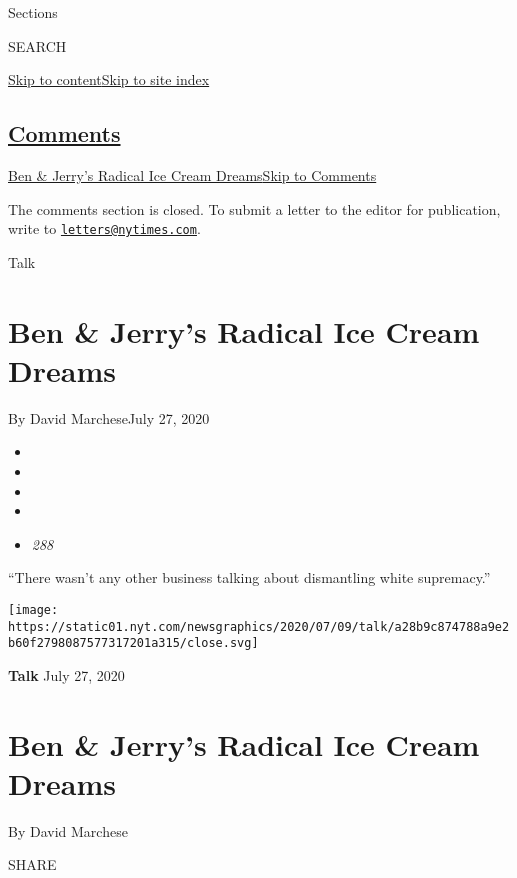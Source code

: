 Sections

SEARCH

\protect\hyperlink{site-content}{Skip to
content}\protect\hyperlink{site-index}{Skip to site index}

\hypertarget{comments}{%
\subsection{\texorpdfstring{\protect\hyperlink{commentsContainer}{Comments}}{Comments}}\label{comments}}

\href{}{Ben \& Jerry's Radical Ice Cream Dreams}\href{}{Skip to
Comments}

The comments section is closed. To submit a letter to the editor for
publication, write to
\href{mailto:letters@nytimes.com}{\nolinkurl{letters@nytimes.com}}.

Talk

\hypertarget{ben--jerrys-radical-ice-cream-dreams}{%
\section{Ben \& Jerry's Radical Ice Cream
Dreams}\label{ben--jerrys-radical-ice-cream-dreams}}

By David MarcheseJuly 27, 2020

\begin{itemize}
\item
\item
\item
\item
\item
  \emph{288}
\end{itemize}

``There wasn't any other business talking about dismantling white
supremacy.''

\texttt{[image: https://static01.nyt.com/newsgraphics/2020/07/09/talk/a28b9c874788a9e2b60f2798087577317201a315/close.svg]}

\textbf{Talk} July 27, 2020

\hypertarget{ben--jerrys-radical-ice-cream-dreams-1}{%
\section{Ben \& Jerry's Radical Ice Cream
Dreams}\label{ben--jerrys-radical-ice-cream-dreams-1}}

By David Marchese

SHARE


